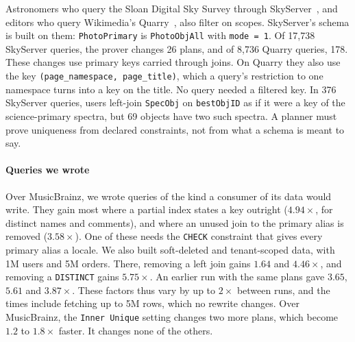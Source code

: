 \documentclass[conference]{IEEEtran}
\theoremstyle{definition}
\newcommand{\sql}[1]{\texttt{#1}}
\begin{document}
\else
Astronomers who query the Sloan Digital Sky Survey through SkyServer~\cite{SkyServer}, and editors who query Wikimedia's
Quarry~\cite{Quarry}, also filter on scopes. SkyServer's schema is built on them: \sql{PhotoPrimary} is \sql{PhotoObjAll}
with \sql{mode = 1}. Of 17{,}738 SkyServer queries, the prover changes 26 plans, and of 8{,}736 Quarry queries, 178. These
changes use primary keys carried through joins. On Quarry they also use the key \sql{(page\_namespace, page\_title)},
which a query's restriction to one namespace turns into a key on the title. No query needed a filtered key. In 376 SkyServer queries, users left-join \sql{SpecObj} on \sql{bestObjID} as if it were a key of the
science-primary spectra, but 69 objects have two such spectra. A planner must prove uniqueness from declared
constraints, not from what a schema is meant to say.

\fi
\paragraph*{Queries we wrote} Over MusicBrainz, we wrote queries of the kind a consumer of its data would write. They
gain most where a partial index states a key outright ($4.94\times$, for distinct names and comments), and where an
unused join to the primary alias is removed ($3.58\times$). One of these needs the \sql{CHECK} constraint that gives every
primary alias a locale. We also built soft-deleted and tenant-scoped data, with 1M users and 5M orders. There, removing a
left join gains $1.64$ and $4.46\times$, and removing a \sql{DISTINCT} gains $5.75\times$. An earlier run with the same
plans gave $3.65$, $5.61$ and $3.87\times$. These factors thus vary by up to $2\times$ between runs, and the times include
fetching up to 5M rows, which no rewrite changes. Over MusicBrainz, the \sql{Inner Unique} setting changes two more
plans, which become $1.2$ to $1.8\times$ faster. It changes none of the others.
\end{document}
